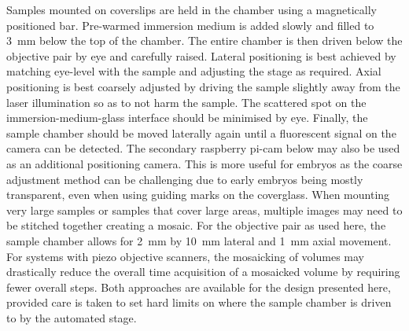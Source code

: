 Samples mounted on coverslips are held in the chamber using a magnetically positioned bar.
Pre-warmed immersion medium is added slowly and filled to \SI{3}{\milli\meter} below the top of the chamber.
The entire chamber is then driven below the objective pair by eye and carefully raised.
Lateral positioning is best achieved by matching eye-level with the sample and adjusting the stage as required.
Axial positioning is best coarsely adjusted by driving the sample slightly away from the laser illumination so as to not harm the sample.
The scattered spot on the immersion-medium-glass interface should be minimised by eye.
Finally, the sample chamber should be moved laterally again until a fluorescent signal on the camera can be detected.
The secondary raspberry pi-cam below may also be used as an additional positioning camera.
This is more useful for embryos as the coarse adjustment method can be challenging due to early embryos being mostly transparent, even when using guiding marks on the coverglass.
When mounting very large samples or samples that cover large areas, multiple images may need to be stitched together creating a mosaic.
For the objective pair as used here, the sample chamber allows for \SI{2}{\milli\metre} by \SI{10}{\milli\metre} lateral and \SI{1}{\milli\metre} axial movement.
For systems with piezo objective scanners, the mosaicking of volumes may drastically reduce the overall time acquisition of a mosaicked volume by requiring fewer overall steps.
Both approaches are available for the design presented here, provided care is taken to set hard limits on where the sample chamber is driven to by the automated stage.



